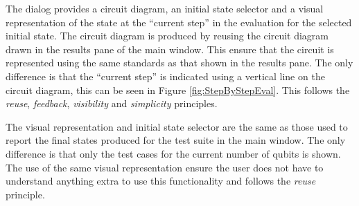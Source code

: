 The dialog provides a circuit diagram, an initial state selector and a visual representation of the state at the ``current step'' in the evaluation for the selected initial state.
The circuit diagram is produced by reusing the circuit diagram drawn in the results pane of the main window.
This ensure that the circuit is represented using the same standards as that shown in the results pane.
The only difference is that the ``current step'' is indicated using a vertical line on the circuit diagram, this can be seen in Figure \ref{fig:StepByStepEval}.
This follows the \emph{reuse}, \emph{feedback},  \emph{visibility} and \emph{simplicity} principles.

The visual representation and initial state selector are the same as those used to report the final states produced for the test suite in the main window.
The only difference is that only the test cases for the current number of qubits is shown.
The use of the same visual representation ensure the user does not have to understand anything extra to use this functionality and follows the \emph{reuse} principle.




